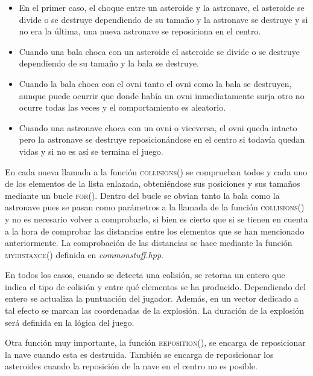 \begin{itemize}
    \item En el primer caso, el choque entre un asteroide y la astronave, el asteroide se divide o se destruye dependiendo de su tamaño y la astronave se destruye y si no era la última, una nueva astronave se reposiciona en el centro.
    \item Cuando una bala choca con un asteroide el asteroide se divide o se destruye dependiendo de su tamaño y la bala se destruye.
    \item Cuando la bala choca con el ovni tanto el ovni como la bala se destruyen, aunque puede ocurrir que donde había un ovni inmediatamente surja otro no ocurre todas las veces y el comportamiento es aleatorio.
    \item Cuando una astronave choca con un ovni o viceversa, el ovni queda intacto pero la astronave se destruye reposicionándose en el centro si todavía quedan vidas y si no es así se termina el juego.
\end{itemize}

En cada nueva llamada a la función \textsc{collisions()} se comprueban todos y cada uno de los elementos de la lista enlazada, obteniéndose sus posiciones y sus tamaños mediante un bucle \textsc{for()}. Dentro del bucle se obvian tanto la bala como la astronave pues se pasan como parámetros a la llamada de la función \textsc{collisions()} y no es necesario volver a comprobarlo, si bien es cierto que si se tienen en cuenta a la hora de comprobar las distancias entre los elementos que se han mencionado anteriormente. La comprobación de las distancias se hace mediante la función \textsc{mydistance()} definida en \emph{commonstuff.hpp}.

En todos los casos, cuando se detecta una colisión, se retorna un entero que indica el tipo de colisión y entre qué elementos se ha producido. Dependiendo del entero se actualiza la puntuación del jugador.  Además, en un vector dedicado a tal efecto se marcan las coordenadas de la explosión. La duración de la explosión será definida en la lógica del juego.

Otra función muy importante, la función \textsc{reposition()}, se encarga de reposicionar la nave cuando esta es destruida. También se encarga de reposicionar los asteroides cuando la reposición de la nave en el centro no es posible.